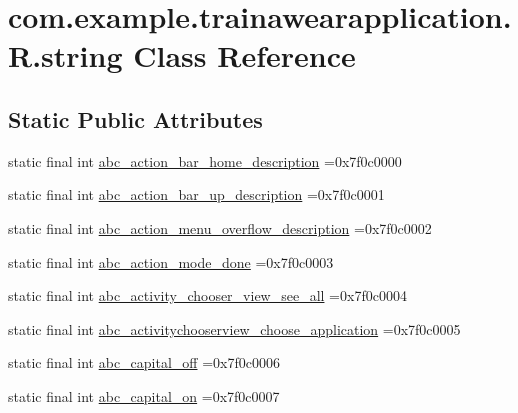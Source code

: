 \hypertarget{classcom_1_1example_1_1trainawearapplication_1_1_r_1_1string}{}\section{com.\+example.\+trainawearapplication.\+R.\+string Class Reference}
\label{classcom_1_1example_1_1trainawearapplication_1_1_r_1_1string}
\subsection*{Static Public Attributes}
\begin{DoxyCompactItemize}
\item 
static final int \mbox{\hyperlink{classcom_1_1example_1_1trainawearapplication_1_1_r_1_1string_aefbaa1c8972461a189212a1e00620ae7}{abc\+\_\+action\+\_\+bar\+\_\+home\+\_\+description}} =0x7f0c0000
\item 
static final int \mbox{\hyperlink{classcom_1_1example_1_1trainawearapplication_1_1_r_1_1string_aa947c309fca4436ee1cc6570ee9f0f5b}{abc\+\_\+action\+\_\+bar\+\_\+up\+\_\+description}} =0x7f0c0001
\item 
static final int \mbox{\hyperlink{classcom_1_1example_1_1trainawearapplication_1_1_r_1_1string_a4bced248c2c4965f19dce47fa7cde060}{abc\+\_\+action\+\_\+menu\+\_\+overflow\+\_\+description}} =0x7f0c0002
\item 
static final int \mbox{\hyperlink{classcom_1_1example_1_1trainawearapplication_1_1_r_1_1string_ac49995daaf29611b1dd4be8f12bfc839}{abc\+\_\+action\+\_\+mode\+\_\+done}} =0x7f0c0003
\item 
static final int \mbox{\hyperlink{classcom_1_1example_1_1trainawearapplication_1_1_r_1_1string_ab36be9dcb37145f83b0854182edacbde}{abc\+\_\+activity\+\_\+chooser\+\_\+view\+\_\+see\+\_\+all}} =0x7f0c0004
\item 
static final int \mbox{\hyperlink{classcom_1_1example_1_1trainawearapplication_1_1_r_1_1string_a69f4c5be93f4246a9f0341c814a80de0}{abc\+\_\+activitychooserview\+\_\+choose\+\_\+application}} =0x7f0c0005
\item 
static final int \mbox{\hyperlink{classcom_1_1example_1_1trainawearapplication_1_1_r_1_1string_a70732907bcd8cb5196540049c9f1ac38}{abc\+\_\+capital\+\_\+off}} =0x7f0c0006
\item 
static final int \mbox{\hyperlink{classcom_1_1example_1_1trainawearapplication_1_1_r_1_1string_a0abf8d86eaba910f493bd0dabe9e8f75}{abc\+\_\+capital\+\_\+on}} =0x7f0c0007

\end{DoxyCompactItemize}
